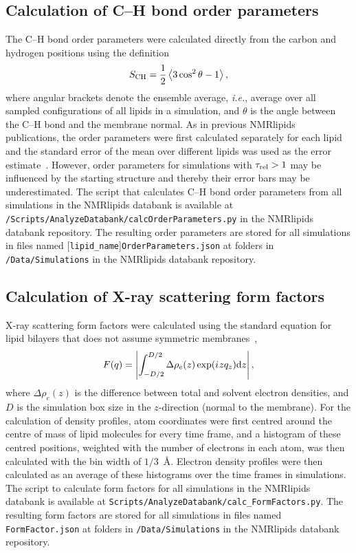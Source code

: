 \documentclass[fleqn,10pt]{wlscirep}
\newcommand{\iu}{{i\mkern1mu}}
\begin{document}
\subsection{Calculation of C--H bond order parameters}
The C--H bond order parameters were calculated directly from the carbon and hydrogen positions using the definition
\begin{equation}\label{OP}
S_{\rm CH}=\frac{1}{2}\left\langle 3\cos^2\theta -1 \right\rangle,
\end{equation}
where angular brackets denote the ensemble average, \textit{i.e.}, average over all sampled configurations of all lipids in a simulation, and $\theta$ is the angle between the C--H bond and the membrane normal. As in previous NMRlipids publications, the order parameters were first calculated separately for each lipid and the standard error of the mean over different lipids was used as the error estimate~\cite{botan15}. However, order parameters for simulations with $\tau_{\rm rel} > 1$ may be influenced by the starting structure and thereby their error bars may be underestimated. The script that calculates C--H bond order parameters from all simulations in the NMRlipids databank is available at \texttt{/Scripts/AnalyzeDatabank/calcOrderParameters.py} in the NMRlipids databank repository. The resulting order parameters are stored for all simulations in files named %
[\texttt{lipid\_name}]\texttt{OrderParameters.json} at folders in \texttt{/Data/Simulations} in the NMRlipids databank repository.

\subsection{Calculation of X-ray scattering form factors}
X-ray scattering form factors were calculated using the standard equation for lipid bilayers that does not assume symmetric membranes~\cite{ollila16},
\begin{equation}\label{FFsimpl}
F(q)= \left\lvert\int_{-D/2}^{D/2}\Delta \rho_e(z) \exp(\iu zq_z) {\rm d}z \right\rvert,
\end{equation}
where $\Delta \rho_e(z)$ is the difference between total and solvent electron densities, and $D$ is the simulation box size in the $z$-direction (normal to the membrane). For the calculation of density profiles, atom coordinates were first centred around the centre of mass of lipid molecules for every time frame, and a histogram of these centred positions, weighted with the number of electrons in each atom, was then calculated with the bin width of $1/3$~\AA{}. Electron density profiles were then calculated as an average of these histograms over the time frames in simulations. The script to calculate form factors for all simulations in the NMRlipids databank is available at \texttt{Scripts/AnalyzeDatabank/calc\_FormFactors.py}. The resulting form factors are stored for all simulations in files named \texttt{FormFactor.json} at folders in \texttt{/Data/Simulations} in the NMRlipids databank repository.
\end{document}
